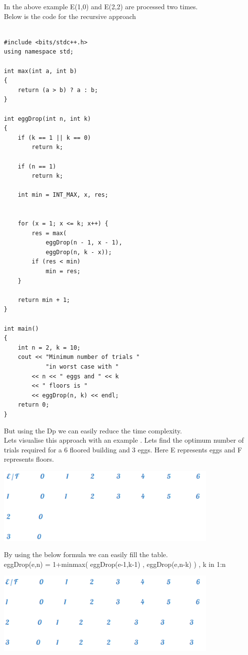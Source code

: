 \documentclass[12pt]{book}
\begin{document}
In the above example E(1,0) and E(2,2) are processed two times.\\
Below is the code for the recursive approach\\
\newline
\begin{lstlisting}

#include <bits/stdc++.h> 
using namespace std; 

int max(int a, int b) 
{ 
    return (a > b) ? a : b; 
} 

int eggDrop(int n, int k) 
{ 
    if (k == 1 || k == 0) 
        return k; 

    if (n == 1) 
        return k; 

    int min = INT_MAX, x, res; 


    for (x = 1; x <= k; x++) { 
        res = max( 
            eggDrop(n - 1, x - 1), 
            eggDrop(n, k - x)); 
        if (res < min) 
            min = res; 
    } 

    return min + 1; 
} 

int main() 
{ 
    int n = 2, k = 10; 
    cout << "Minimum number of trials "
            "in worst case with "
        << n << " eggs and " << k 
        << " floors is "
        << eggDrop(n, k) << endl; 
    return 0; 
} 

\end{lstlisting}
But using the Dp we can easily reduce the time complexity.\\
Lets visualise this approach with an example . Lets find the optimum number of trials required for a 6 floored building and 3 eggs. Here E represents eggs and F represents floors.\\
\newline
\begin{center}
    \includegraphics[width =11cm]{Yg7syDs.png}    
\end{center}
By using the below formula we can easily fill the table.\\
eggDrop(e,n) = 1+min{max( eggDrop(e-1,k-1) , eggDrop(e,n-k) ) , k in 1:n}\\
\begin{center}
    \includegraphics[width =11cm]{QVcKFnk.png}    
\end{center}
\end{document}
